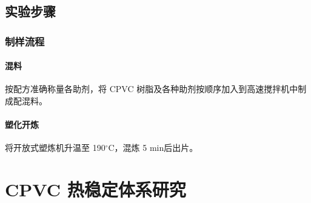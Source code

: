 \documentclass[a4paper, oneside, onecolumn, 12pt]{ctexrep}    %
\newcommand{\cd}{$^{\circ}$C}  %
\begin{document}
\section{实验步骤}

\subsection{制样流程}

\subsubsection{混料}
按配方准确称量各助剂，将 CPVC 树脂及各种助剂按顺序加入到高速搅拌机中制成配混料。
\subsubsection{塑化开炼}
将开放式塑炼机升温至 190\cd，混炼 5 min后出片。


\chapter{CPVC 热稳定体系研究}

\clearpage
{}


\end{document}
